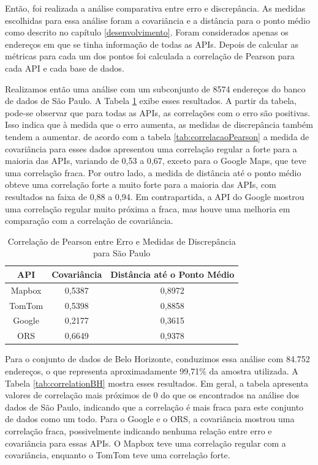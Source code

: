 Então, foi realizada a análise comparativa entre erro e discrepância. As medidas escolhidas para essa análise foram a covariância e a distância para o ponto médio como descrito no capítulo \ref{desenvolvimento}. Foram considerados apenas os endereços em que se tinha informação de todas as APIs. Depois de calcular as métricas para cada um dos pontos foi calculada a correlação de Pearson para cada API e cada base de dados.  

Realizamos então uma análise com um subconjunto de 8574 endereços do banco de dados de São Paulo. A Tabela \ref{tab:correlationSP} exibe esses resultados. A partir da tabela, pode-se observar que para todas as APIs, as correlações com o erro são positivas. Isso indica que à medida que o erro aumenta, as medidas de discrepância também tendem a aumentar. de acordo com a tabela \ref{tab:correlacaoPearson} a medida de covariância para esses dados apresentou uma correlação regular a forte para a maioria das APIs, variando de 0,53 a 0,67, exceto para o Google Maps, que teve uma correlação fraca. Por outro lado, a medida de distância até o ponto médio obteve uma correlação forte a muito forte para a maioria das APIs, com resultados na faixa de 0,88 a 0,94. Em contrapartida, a API do Google mostrou uma correlação regular muito próxima a fraca, mas houve uma melhoria em comparação com a correlação de covariância.

\begin{table}[h]
    \centering
    \caption{Correlação  de Pearson entre Erro e Medidas de Discrepância para São Paulo}
    \label{tab:correlationSP}
    \begin{adjustbox}{width=0.7\textwidth}
    \begin{tabular}{|c|c|c|}
    \hline
    API & Covariância & Distância até o Ponto Médio \\
    \hline
    Mapbox & 0,5387 & 0,8972 \\
    TomTom & 0,5398 & 0,8858 \\
    Google & 0,2177 & 0,3615 \\
    ORS & 0,6649 & 0,9378 \\
    \hline
    \end{tabular}
    \end{adjustbox}
\end{table}

Para o conjunto de dados de Belo Horizonte, conduzimos essa análise com 84.752 endereços, o que representa aproximadamente 99,71\% da amostra utilizada. A Tabela \ref{tab:correlationBH} mostra esses resultados. Em geral, a tabela apresenta valores de correlação mais próximos de 0 do que os encontrados na análise dos dados de São Paulo, indicando que a correlação é mais fraca para este conjunto de dados como um todo. Para o Google e o ORS, a covariância mostrou uma correlação fraca, possivelmente indicando nenhuma relação entre erro e covariância para essas APIs. O Mapbox teve uma correlação regular com a covariância, enquanto o TomTom teve uma correlação forte.

